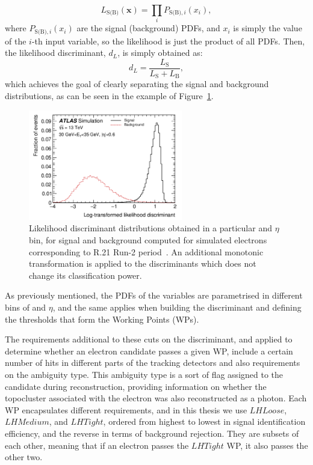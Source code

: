 \begin{equation}
  L_{\text{S(B)}} (\textbf{x}) = \prod_{i} P_{\text{S(B)},i}(x_{i}),
\end{equation}
where $P_{\text{S(B)},i}(x_{i})$ are the signal (background) PDFs, and $x_{i}$ is simply the value of the $i$-th input variable, so the likelihood is just the product of all PDFs.
Then, the likelihood discriminant, $d_{L}$, is simply obtained as:
\begin{equation}
  d_{L} = \frac{L_{\text{S}}}{L_{\text{S}} + L_{\text{B}}},
\end{equation}
which achieves the goal of clearly separating the signal and background distributions, as can be seen in the example of Figure~\ref{fig:lhdis}.
\begin{figure}[htbp]
  \centering
  \includegraphics[width=0.6\textwidth]{images/lhdis.png}
  \caption{Likelihood discriminant distributions obtained in a particular \et and $\eta$ bin, for signal and background computed for simulated electrons corresponding to R.21 Run-2 period~\cite{Aaboud:2657964}. An additional monotonic transformation is applied to the discriminants which does not change its classification power.}
  \label{fig:lhdis}
\end{figure}

As previously mentioned, the PDFs of the variables are parametrised in different bins of \et and $\eta$, and the same applies when building the discriminant and defining the thresholds that form the Working Points (WPs).

The requirements additional to these cuts on the discriminant, and applied to determine whether an electron candidate passes a given WP, include a certain number of hits in different parts of the tracking detectors and also requirements on the ambiguity type. This ambiguity type is a sort of flag assigned to the candidate during reconstruction, providing information on whether the topocluster associated with the electron was also reconstructed as a photon.
Each WP encapsulates different requirements, and in this thesis we use $LHLoose$, $LHMedium$, and $LHTight$, ordered from highest to lowest in signal identification efficiency, and the reverse in terms of background rejection. They are subsets of each other, meaning that if an electron passes the $LHTight$ WP, it also passes the other two.

